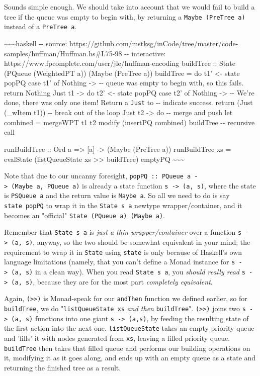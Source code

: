 \documentclass[]{article}
\begin{document}
Sounds simple enough. We should take into account that we would fail to build a
tree if the queue was empty to begin with, by returning a
\texttt{Maybe\ (PreTree\ a)} instead of a \texttt{PreTree\ a}.

\textasciitilde{}\textasciitilde{}\textasciitilde{}haskell -\/- source:
https://github.com/mstksg/inCode/tree/master/code-samples/huffman/Huffman.hs\#L75-98
-\/- interactive: https://www.fpcomplete.com/user/jle/huffman-encoding buildTree
:: State (PQueue (WeightedPT a)) (Maybe (PreTree a)) buildTree = do t1'
\textless{}- state popPQ case t1' of Nothing -\textgreater{} -\/- queue was
empty to begin with, so this fails. return Nothing Just t1 -\textgreater{} do
t2' \textless{}- state popPQ case t2' of Nothing -\textgreater{} -\/- We're
done, there was only one item! Return a \texttt{Just} to -\/- indicate success.
return (Just (\_wItem t1)) -\/- break out of the loop Just t2 -\textgreater{} do
-\/- merge and push let combined = mergeWPT t1 t2 modify (insertPQ combined)
buildTree -\/- recursive call

runBuildTree :: Ord a =\textgreater{} {[}a{]} -\textgreater{} (Maybe (PreTree
a)) runBuildTree xs = evalState (listQueueState xs \textgreater{}\textgreater{}
buildTree) emptyPQ \textasciitilde{}\textasciitilde{}\textasciitilde{}

Note that due to our uncanny foresight,
\texttt{popPQ\ ::\ PQueue\ a\ -\textgreater{}\ (Maybe\ a,\ PQueue\ a)} is
already a state function \texttt{s\ -\textgreater{}\ (a,\ s)}, where the state
is \texttt{PSQueue\ a} and the return value is \texttt{Maybe\ a}. So all we need
to do is say \texttt{state\ popPQ} to wrap it in the \texttt{State\ s\ a}
newtype wrapper/container, and it becomes an "official"
\texttt{State\ (PQueue\ a)\ (Maybe\ a)}.

Remember that \texttt{State\ s\ a} is \emph{just a thin wrapper/container} over
a function \texttt{s\ -\textgreater{}\ (a,\ s)}, anyway, so the two should be
somewhat equivalent in your mind; the requirement to wrap it in \texttt{State}
using \texttt{state} is only because of Haskell's own language limitations
(namely, that you can't define a Monad instance for
\texttt{s\ -\textgreater{}\ (a,\ s)} in a clean way). When you read
\texttt{State\ s\ a}, you \emph{should really read}
\texttt{s\ -\textgreater{}\ (a,\ s)}, because they are for the most part
\emph{completely equivalent}.

Again, \texttt{(\textgreater{}\textgreater{})} is Monad-speak for our
\texttt{andThen} function we defined earlier, so for \texttt{buildTree}, we do
"\texttt{listQueueState\ xs} \emph{and then} \texttt{buildTree}".
\texttt{(\textgreater{}\textgreater{})} joins two
\texttt{s\ -\textgreater{}\ (a,\ s)} functions into one giant
\texttt{s\ -\textgreater{}\ (a,s)}, by feeding the resulting state of the first
action into the next one. \texttt{listQueueState} takes an empty priority queue
and 'fills' it with nodes generated from \texttt{xs}, leaving a filled priority
queue. \texttt{buildTree} then takes that filled queue and performs our building
operations on it, modifying it as it goes along, and ends up with an empty queue
as a state and returning the finished tree as a result.
\end{document}
